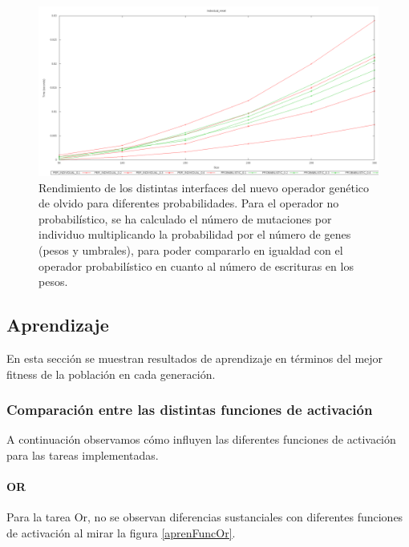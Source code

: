 \documentclass[11pt]{article}
\begin{document}
\begin{titlepage}
\begin{figure}[htb]
\centering
\includegraphics[width=\textwidth]{./img/Individual_reset.png}
\caption{\label{rendGenOlvido}Rendimiento de los distintas interfaces del nuevo operador genético de olvido para diferentes probabilidades. Para el operador no probabilístico, se ha calculado el número de mutaciones por individuo multiplicando la probabilidad por el número de genes (pesos y umbrales), para poder compararlo en igualdad con el operador probabilístico en cuanto al número de escrituras en los pesos.}
\end{figure}
\newpage
\subsection{Aprendizaje}
\label{sec-6-2}

  \label{aprendizaje}

En esta sección se muestran resultados de aprendizaje en términos del mejor fitness de la población en cada generación.
\subsubsection{Comparación entre las distintas funciones de activación}
\label{sec-6-2-1}

   \label{aprendFunc}

A continuación observamos cómo influyen las diferentes funciones de activación para las tareas implementadas.
\paragraph{OR}
\label{sec-6-2-1-1}


Para la tarea Or, no se observan diferencias sustanciales con diferentes funciones de activación al mirar la figura \ref{aprenFuncOr}.


\end{titlepage}
\end{document}
